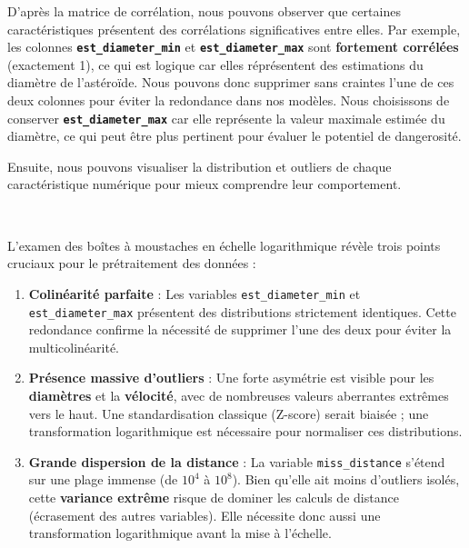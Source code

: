 \documentclass[11pt]{article}
\providecommand{\tightlist}{%
      \setlength{\itemsep}{0pt}\setlength{\parskip}{0pt}}
\begin{document}
D'après la matrice de corrélation, nous pouvons observer que certaines
caractéristiques présentent des corrélations significatives entre elles.
Par exemple, les colonnes \textbf{\texttt{est\_diameter\_min}} et
\textbf{\texttt{est\_diameter\_max}} sont \textbf{fortement corrélées}
(exactement 1), ce qui est logique car elles réprésentent des
estimations du diamètre de l'astéroïde. Nous pouvons donc supprimer sans
craintes l'une de ces deux colonnes pour éviter la redondance dans nos
modèles. Nous choisissons de conserver
\textbf{\texttt{est\_diameter\_max}} car elle représente la valeur
maximale estimée du diamètre, ce qui peut être plus pertinent pour
évaluer le potentiel de dangerosité.

Ensuite, nous pouvons visualiser la distribution et outliers de chaque
caractéristique numérique pour mieux comprendre leur comportement.

\begin{center}
\end{center}
{ \hspace*{\fill} \\}

L'examen des boîtes à moustaches en échelle logarithmique révèle trois
points cruciaux pour le prétraitement des données :

\begin{enumerate}
  \def\labelenumi{\arabic{enumi}.}
  \tightlist
  \item
        \textbf{Colinéarité parfaite} : Les variables
        \texttt{est\_diameter\_min} et \texttt{est\_diameter\_max} présentent
        des distributions strictement identiques. Cette redondance confirme la
        nécessité de supprimer l'une des deux pour éviter la multicolinéarité.
  \item
        \textbf{Présence massive d'outliers} : Une forte asymétrie est visible
        pour les \textbf{diamètres} et la \textbf{vélocité}, avec de
        nombreuses valeurs aberrantes extrêmes vers le haut. Une
        standardisation classique (Z-score) serait biaisée ; une
        transformation logarithmique est nécessaire pour normaliser ces
        distributions.
  \item
        \textbf{Grande dispersion de la distance} : La variable
        \texttt{miss\_distance} s'étend sur une plage immense (de \(10^4\) à
        \(10^8\)). Bien qu'elle ait moins d'outliers isolés, cette
        \textbf{variance extrême} risque de dominer les calculs de distance
        (écrasement des autres variables). Elle nécessite donc aussi une
        transformation logarithmique avant la mise à l'échelle.
\end{enumerate}
\end{document}
